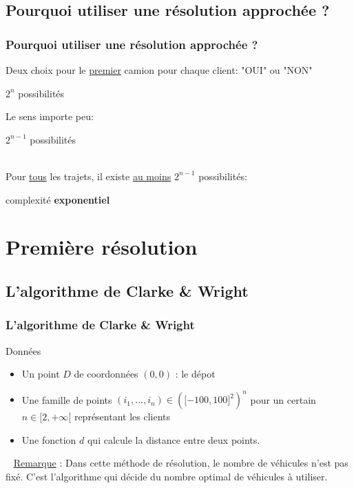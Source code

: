 \documentclass[10pt]{beamer}
\begin{document}
	\subsection{Pourquoi utiliser une résolution approchée ?}

	\begin{frame}
		\frametitle{Pourquoi utiliser une résolution approchée ?}
		Deux choix pour le \underline{premier} camion pour chaque client: "OUI" ou "NON"
		\pause
		\begin{center}
			$2^n$ possibilités
		\end{center}
		\pause
		Le sens importe peu:
		\begin{center}
			$2^{n-1}$ possibilités
		\end{center}
		\pause
		\ \\Pour \underline{tous} les trajets, il existe \underline{au moins} $2^{n-1}$ possibilités: \pause 
		\begin{center}
			complexité \textbf{exponentiel}
		\end{center}
	\end{frame}

	\section{Première résolution}

	\subsection{L'algorithme de Clarke \& Wright}

	\begin{frame}
		\frametitle{L'algorithme de Clarke \& Wright}
		\begin{beamerboxesrounded}[upper=data_up,lower=data_low,shadow=true]{Données}
			\begin{itemize}[label=-]
				\item Un point $D$ de coordonnées $(0,0)$ : le dépot
				\pause
				\item Une famille de points \((i_1,...,i_n) \in {(\lbrack-100,100\rbrack^2)}^n\) pour un certain $n \in \lbrack2,+\infty\lbrack$ représentant les clients
				\pause
				\item Une fonction $d$ qui calcule la distance entre deux points.
				\pause
			\end{itemize}
		\end{beamerboxesrounded}\ \newline
		\underline{Remarque} : Dans cette méthode de résolution, le nombre de véhicules n'est pas fixé. C'est l'algorithme qui décide du nombre optimal de véhicules à utiliser. 
	\end{frame}
	 
\end{document}
